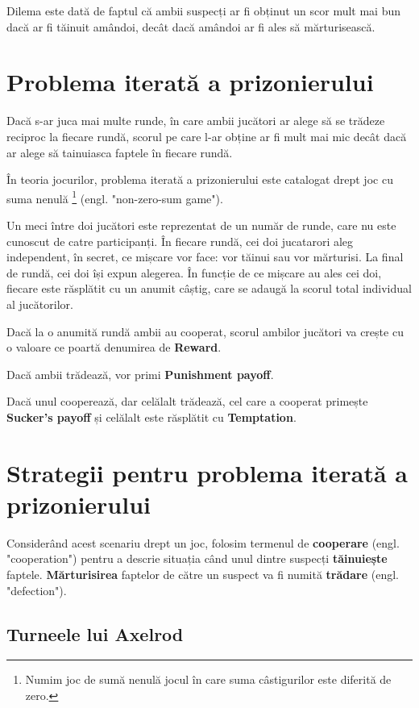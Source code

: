 Dilema este dată de faptul că ambii suspecți ar fi obținut un scor mult mai bun dacă ar fi tăinuit amândoi, decât dacă amândoi ar fi ales să mărturisească.

\section {Problema iterată a prizonierului} 

Dacă s-ar juca mai multe runde, în care ambii jucători ar alege să se trădeze reciproc la fiecare rundă, scorul pe care l-ar obține ar fi mult mai mic decât dacă ar alege să tainuiasca faptele în fiecare rundă. 

În teoria jocurilor, problema iterată a prizonierului este catalogat drept joc cu suma nenulă \footnote{Numim joc de sumă nenulă jocul în care suma câstigurilor este diferită de zero.} (engl. "non-zero-sum game").

Un meci între doi jucători este reprezentat de un număr de runde, care nu este cunoscut de catre participanți.
În fiecare rundă, cei doi jucatarori aleg independent, în secret, ce mișcare vor face: vor tăinui sau vor mărturisi. La final de rundă, cei doi își expun alegerea. În funcție de ce mișcare au ales cei doi, fiecare este răsplătit cu un anumit câștig, care se adaugă la scorul total individual al jucătorilor. 

Dacă la o anumită rundă ambii au cooperat, scorul ambilor jucători va crește cu o valoare ce poartă denumirea de \textbf{Reward}. 

Dacă ambii trădează, vor primi \textbf{Punishment payoff}. 

Dacă unul cooperează, dar celălalt trădează, cel care a cooperat primește \textbf{Sucker's payoff} și celălalt este răsplătit cu \textbf{Temptation}. 

\section {Strategii pentru problema iterată a prizonierului}

Considerând acest scenariu drept un joc, folosim termenul de \textbf{cooperare} (engl. "cooperation") pentru a descrie situația când unul dintre suspecți \textbf{tăinuiește} faptele. \textbf{Mărturisirea} faptelor de către un suspect va fi numită \textbf{trădare} (engl. "defection"). 

\subsection{Turneele lui Axelrod}

